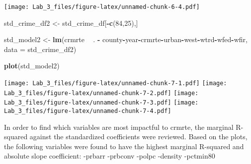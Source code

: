 \documentclass[]{article}
\newenvironment{Shaded}{\begin{snugshade}}{\end{snugshade}}
\newcommand{\KeywordTok}[1]{\textcolor[rgb]{0.13,0.29,0.53}{\textbf{#1}}}
\newcommand{\DataTypeTok}[1]{\textcolor[rgb]{0.13,0.29,0.53}{#1}}
\newcommand{\DecValTok}[1]{\textcolor[rgb]{0.00,0.00,0.81}{#1}}
\newcommand{\StringTok}[1]{\textcolor[rgb]{0.31,0.60,0.02}{#1}}
\newcommand{\CommentTok}[1]{\textcolor[rgb]{0.56,0.35,0.01}{\textit{#1}}}
\newcommand{\OperatorTok}[1]{\textcolor[rgb]{0.81,0.36,0.00}{\textbf{#1}}}
\newcommand{\NormalTok}[1]{#1}
\begin{document}
\texttt{[image: Lab\_3\_files/figure-latex/unnamed-chunk-6-4.pdf]}

\begin{Shaded}
\end{Shaded}

\begin{Shaded}
\begin{Highlighting}[]
\NormalTok{std_crime_df2 <-}\StringTok{ }\NormalTok{std_crime_df[}\OperatorTok{-}\KeywordTok{c}\NormalTok{(}\DecValTok{84}\NormalTok{,}\DecValTok{25}\NormalTok{),]}

\NormalTok{std_model2 <-}\StringTok{ }\KeywordTok{lm}\NormalTok{(crmrte }\OperatorTok{~}\StringTok{ }\NormalTok{. }\OperatorTok{-}\StringTok{ }\NormalTok{county}\OperatorTok{-}\NormalTok{year}\OperatorTok{-}\NormalTok{crmrte}\OperatorTok{-}\NormalTok{urban}\OperatorTok{-}\NormalTok{west}\OperatorTok{-}\NormalTok{wtrd}\OperatorTok{-}\NormalTok{wfed}\OperatorTok{-}\NormalTok{wfir, }\DataTypeTok{data =}\NormalTok{  std_crime_df2)}

\KeywordTok{plot}\NormalTok{(std_model2)}
\end{Highlighting}
\end{Shaded}

\texttt{[image: Lab\_3\_files/figure-latex/unnamed-chunk-7-1.pdf]}
\texttt{[image: Lab\_3\_files/figure-latex/unnamed-chunk-7-2.pdf]}
\texttt{[image: Lab\_3\_files/figure-latex/unnamed-chunk-7-3.pdf]}
\texttt{[image: Lab\_3\_files/figure-latex/unnamed-chunk-7-4.pdf]}

In order to find which variables are most impactful to crmrte, the
marginal R-squared against the standardized coefficients were reviewed.
Based on the plots, the following variables were found to have the
highest marginal R-squared and absolute slope coefficient: -prbarr
-prbconv -polpc -density -pctmin80
\end{document}
